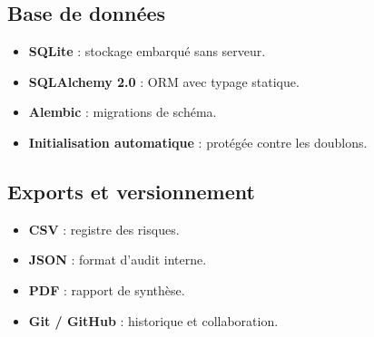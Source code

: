 \documentclass[12pt,a4paper]{article}
\newcommand{\forcereset}[1]{}
\begin{document}
\subsection{Base de données}
\forcereset{5}

\begin{itemize}[leftmargin=1.2cm, itemsep=0.2\baselineskip]
    \item \textbf{SQLite} : stockage embarqué sans serveur.
    \item \textbf{SQLAlchemy 2.0} : ORM avec typage statique.
    \item \textbf{Alembic} : migrations de schéma.
    \item \textbf{Initialisation automatique} : protégée contre les doublons.
\end{itemize}

\subsection{Exports et versionnement}
\forcereset{4}

\begin{itemize}[leftmargin=1.2cm, itemsep=0.2\baselineskip]
    \item \textbf{CSV} : registre des risques.
    \item \textbf{JSON} : format d'audit interne.
    \item \textbf{PDF} : rapport de synthèse.
    \item \textbf{Git / GitHub} : historique et collaboration.
\end{itemize}
\end{document}
